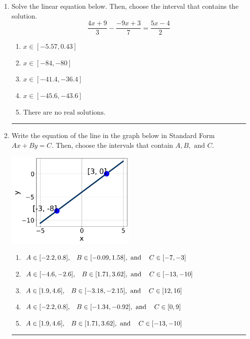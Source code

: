\documentclass[14pt]{extbook}
\newcommand{\litem}[1]{\item#1\hspace*{-1cm}\rule{\textwidth}{0.4pt}}
\begin{document}
\begin{enumerate}
{\begin{enumerate}[label=\Alph*.]
\end{enumerate} }
\litem{
Solve the linear equation below. Then, choose the interval that contains the solution.\[ \frac{4x + 9}{3} - \frac{-9x + 3}{7} = \frac{5x -4}{2} \]\begin{enumerate}[label=\Alph*.]
\item \( x \in [-5.57, 0.43] \)
\item \( x \in [-84, -80] \)
\item \( x \in [-41.4, -36.4] \)
\item \( x \in [-45.6, -43.6] \)
\item \( \text{There are no real solutions.} \)

\end{enumerate} }
\litem{
Write the equation of the line in the graph below in Standard Form $Ax+By=C$. Then, choose the intervals that contain $A, B, \text{ and } C$.
\begin{center}
    \includegraphics[width=0.5\textwidth]{../Figures/linearGraphToStandardCopyA.png}
\end{center}
\begin{enumerate}[label=\Alph*.]
\item \( A \in [-2.2, 0.8], \hspace{3mm} B \in [-0.09, 1.58], \text{ and } \hspace{3mm} C \in [-7, -3] \)
\item \( A \in [-4.6, -2.6], \hspace{3mm} B \in [1.71, 3.62], \text{ and } \hspace{3mm} C \in [-13, -10] \)
\item \( A \in [1.9, 4.6], \hspace{3mm} B \in [-3.18, -2.15], \text{ and } \hspace{3mm} C \in [12, 16] \)
\item \( A \in [-2.2, 0.8], \hspace{3mm} B \in [-1.34, -0.92], \text{ and } \hspace{3mm} C \in [0, 9] \)
\item \( A \in [1.9, 4.6], \hspace{3mm} B \in [1.71, 3.62], \text{ and } \hspace{3mm} C \in [-13, -10] \)


\end{enumerate}}
\end{enumerate}
\end{document}
